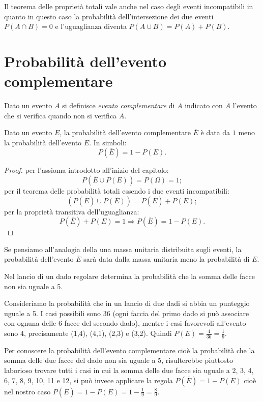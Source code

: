 \osservazione Il teorema delle proprietà totali vale anche nel caso degli 
eventi 
incompatibili in quanto in questo caso la probabilità dell'intersezione dei due 
eventi $P(A\cap B)=0$ e l'uguaglianza diventa $P(A\cup B)=P(A)+P(B)$.


\section{Probabilità dell'evento complementare}
\label{sec:09_complementare}

Dato un evento $A$ si definisce \emph{evento complementare} di $A$ indicato con 
$\overline A$ l'evento che si verifica quando non si verifica $A$.
\begin{teorema}
Dato un evento $E$, la probabilità dell'evento complementare $\overline E$ è 
data da $1$ meno la probabilità dell'evento $E$. In simboli: \[ P(\overline 
E)=1-P(E). \]
\end{teorema}
\begin{proof} per l'assioma introdotto all'inizio del capitolo: \[ P(\overline 
E\cup P(E))=P(\Omega )=1; \]
per il teorema delle probabilità totali essendo i due eventi incompatibili: \[ 
(P(\overline E)\cup P(E))=P(\overline E)+P(E); \]
per la proprietà transitiva dell'uguaglianza: \[ P(\overline E)+P(E)=1 
\Rightarrow P(\overline E)=1-P(E). \]
\end{proof}

Se pensiamo all'analogia della una massa unitaria distribuita sugli eventi, la 
probabilità dell'evento $\overline E$ sarà data dalla massa unitaria meno la 
probabilità di $E$.

\begin{esempio}
Nel lancio di un dado regolare determina la probabilità che la somma delle 
facce 
non sia uguale a 5.

Consideriamo la probabilità che in un lancio di due dadi si abbia un punteggio 
uguale a 5. I casi possibili sono 36 (ogni faccia del primo dado si può 
associare con ognuna delle 6 facce del secondo dado), mentre i casi favorevoli 
all'evento sono 4, precisamente (1,4), (4,1), (2,3) e (3,2). Quindi $P(E)=\frac 
4{36}=\frac 1 9$.

Per conoscere la probabilità dell'evento complementare cioè la probabilità che 
la somma delle due facce del dado non sia uguale a 5, risulterebbe piuttosto 
laborioso trovare tutti i casi in cui la somma delle due facce sia uguale a 2, 
3, 4, 6, 7, 8, 9, 10, 11 e 12, si può invece applicare la regola $P(\overline 
E)=1-P(E)$ cioè nel nostro caso $P(\overline E)=1-P(E)=1-\frac 1 9=\frac 8 9$.
\end{esempio}

